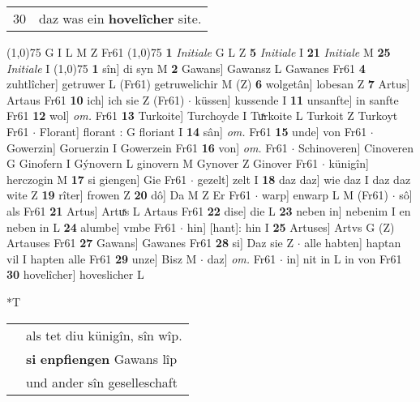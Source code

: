\documentclass[8pt,a4paper,notitlepage]{article}
\begin{document}
\begin{table}[ht]
\begin{minipage}[t]{0.5\linewidth}
\begin{tabular}{rl}
30 & daz was ein \textbf{hovelîcher} site.\\ 
\end{tabular}
\scriptsize
\line(1,0){75} \newline
G I L M Z Fr61 \newline
\line(1,0){75} \newline
\textbf{1} \textit{Initiale} G L Z  \textbf{5} \textit{Initiale} I  \textbf{21} \textit{Initiale} M  \textbf{25} \textit{Initiale} I  \newline
\line(1,0){75} \newline
\textbf{1} sîn] di syn M \textbf{2} Gawans] Gawansz L Gawanes Fr61 \textbf{4} zuhtlîcher] getruwer L (Fr61) getruwelichir M (Z) \textbf{6} wolgetân] lobesan Z \textbf{7} Artus] Artaus Fr61 \textbf{10} ich] ich sie Z (Fr61)  $\cdot$ küssen] kussende I \textbf{11} unsanfte] in sanfte Fr61 \textbf{12} wol] \textit{om.} Fr61 \textbf{13} Turkoite] Turchoyde I Tuͯrkoite L Turkoit Z Turkoyt Fr61  $\cdot$ Florant] florant : G floriant I \textbf{14} sân] \textit{om.} Fr61 \textbf{15} unde] von Fr61  $\cdot$ Gowerzin] Goruerzin I Gowerzein Fr61 \textbf{16} von] \textit{om.} Fr61  $\cdot$ Schinoveren] Cinoveren G Ginofern I Gýnovern L ginovern M Gynover Z Ginover Fr61  $\cdot$ künigîn] herczogin M \textbf{17} si giengen] Gie Fr61  $\cdot$ gezelt] zelt I \textbf{18} daz daz] wie daz I daz daz wite Z \textbf{19} rîter] frowen Z \textbf{20} dô] Da M Z Er Fr61  $\cdot$ warp] enwarp L M (Fr61)  $\cdot$ sô] als Fr61 \textbf{21} Artus] Artuͯs L Artaus Fr61 \textbf{22} dise] die L \textbf{23} neben in] nebenim I en neben in L \textbf{24} alumbe] vmbe Fr61  $\cdot$ hin] [hant]: hin I \textbf{25} Artuses] Artvs G (Z) Artauses Fr61 \textbf{27} Gawans] Gawanes Fr61 \textbf{28} si] Daz sie Z  $\cdot$ alle habten] haptan vil I hapten alle Fr61 \textbf{29} unze] Bisz M  $\cdot$ daz] \textit{om.} Fr61  $\cdot$ in] nit in L in von Fr61 \textbf{30} hovelîcher] hoveslicher L \newline
\end{minipage}
\hspace{0.5cm}
\begin{minipage}[t]{0.5\linewidth}
\small
\begin{center}*T
\end{center}
\begin{tabular}{rl}
 & als tet diu künigîn, sîn wîp.\\ 
 & \textbf{si} \textbf{enpfiengen} Gawans lîp\\ 
 & und ander sîn geselleschaft\\ 

\end{tabular}
\end{minipage}
\end{table}
\end{document}
